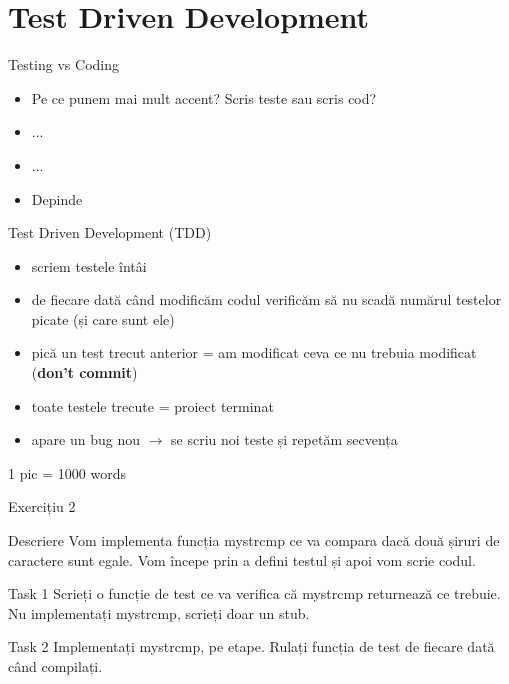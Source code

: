 \documentclass{beamer}
\begin{document}
\section{Test Driven Development}

\begin{frame}{Testing vs Coding}
  \begin{itemize}[<+->]
    \item Pe ce punem mai mult accent? Scris teste sau scris cod?
    \item ...
    \item ...
    \item Depinde
  \end{itemize}
\end{frame}

\begin{frame}{Test Driven Development (TDD)}
  \begin{itemize}[<+->]
    \item scriem testele întâi
    \item de fiecare dată când modificăm codul verificăm să nu scadă numărul
    testelor picate (și care sunt ele)
    \item pică un test trecut anterior = am modificat ceva ce nu trebuia
    modificat (\textbf{don't commit})
    \item toate testele trecute = proiect terminat
    \item apare un bug nou $\rightarrow$ se scriu noi teste și repetăm
    secvența
  \end{itemize}
\end{frame}

\begin{frame}{1 pic = 1000 words}
\end{frame}

\begin{frame}{Exercițiu 2}
  \begin{block}{Descriere}
    Vom implementa funcția mystrcmp ce va compara dacă două șiruri de
    caractere sunt egale. Vom începe prin a defini testul și apoi vom scrie
    codul.
  \end{block}
  \begin{block}{Task 1}
    Scrieți o funcție de test ce va verifica că mystrcmp returnează ce
    trebuie. Nu implementați mystrcmp, scrieți doar un stub.
  \end{block}
  \pause
  \begin{block}{Task 2}
    Implementați mystrcmp, pe etape. Rulați funcția de test de fiecare dată
    când compilați.
  \end{block}
\end{frame}
\end{document}
